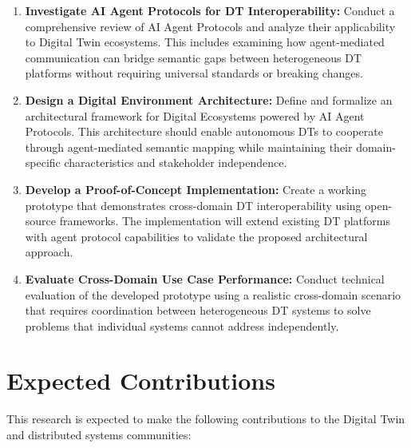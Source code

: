 \begin{enumerate}
    \item \textbf{Investigate AI Agent Protocols for DT Interoperability:} 
    Conduct a comprehensive review of AI Agent Protocols and analyze their applicability to Digital Twin ecosystems.
    This includes examining how agent-mediated communication can bridge semantic gaps between heterogeneous DT platforms
      without requiring universal standards or breaking changes.

    \item \textbf{Design a Digital Environment Architecture:}
    Define and formalize an architectural framework for Digital Ecosystems powered by AI Agent Protocols.
      This architecture should enable autonomous DTs to cooperate through agent-mediated semantic mapping
        while maintaining their domain-specific characteristics and stakeholder independence.

    \item \textbf{Develop a Proof-of-Concept Implementation:}
    Create a working prototype that demonstrates cross-domain DT interoperability using open-source frameworks.
      The implementation will extend existing DT platforms with agent protocol capabilities to validate the proposed architectural approach.

    \item \textbf{Evaluate Cross-Domain Use Case Performance:}
    Conduct technical evaluation of the developed prototype using a realistic cross-domain scenario
      that requires coordination between heterogeneous DT systems to solve problems that individual systems cannot address independently.
\end{enumerate}

\section{Expected Contributions}
\label{sec:contributions}

This research is expected to make the following contributions to the Digital Twin and distributed systems communities:

